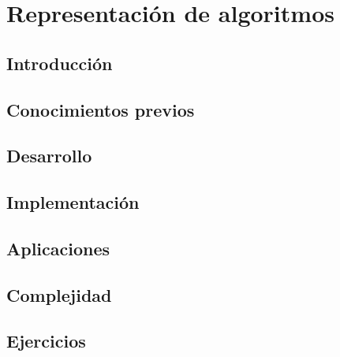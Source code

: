 \chapter{Representación de algoritmos}
\section{Introducción}

\section{Conocimientos previos}

\section{Desarrollo}

\section{Implementación}

\section{Aplicaciones}

\section{Complejidad}

\section{Ejercicios}
